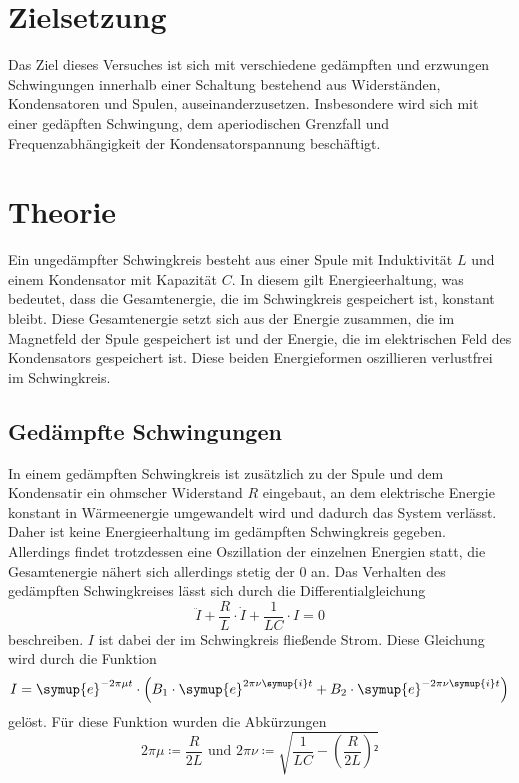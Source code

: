 \section{Zielsetzung}
\label{sec:Zielsetzung}
Das Ziel dieses Versuches ist sich mit verschiedene gedämpften und erzwungen Schwingungen innerhalb einer Schaltung
 bestehend aus Widerständen, Kondensatoren und Spulen, auseinanderzusetzen. Insbesondere wird sich mit einer gedäpften Schwingung, dem aperiodischen 
 Grenzfall und Frequenzabhängigkeit der Kondensatorspannung beschäftigt. 
\section{Theorie}
\label{sec:Theorie}
Ein ungedämpfter Schwingkreis besteht aus einer Spule mit Induktivität $L$ und einem Kondensator mit Kapazität $C$. In diesem gilt Energieerhaltung, was bedeutet, 
dass die Gesamtenergie, die im Schwingkreis gespeichert ist, konstant bleibt. Diese Gesamtenergie setzt sich aus der Energie zusammen, die im Magnetfeld der Spule
gespeichert ist und der Energie, die im elektrischen Feld des Kondensators gespeichert ist. Diese beiden Energieformen oszillieren verlustfrei im Schwingkreis. 

\subsection{Gedämpfte Schwingungen}
In einem gedämpften Schwingkreis ist zusätzlich zu der Spule und dem Kondensatir ein ohmscher Widerstand $R$ eingebaut, an dem elektrische Energie konstant in 
Wärmeenergie umgewandelt wird und dadurch das System verlässt. Daher ist keine Energieerhaltung im gedämpften Schwingkreis gegeben. Allerdings findet trotzdessen eine 
Oszillation der einzelnen Energien statt, die Gesamtenergie nähert sich allerdings stetig der $0$ an. 
Das Verhalten des gedämpften Schwingkreises lässt sich durch die Differentialgleichung 
\begin{equation}
    \ddot{I} + \frac{R}{L} \cdot \dot{I} + \frac{1}{L C} \cdot I = 0 
\end{equation}
beschreiben. $I$ ist dabei der im Schwingkreis fließende Strom. 
Diese Gleichung wird durch die Funktion  
\begin{equation}
    I = \symup{e}^{-2\pi\mu t} \cdot \left(B_1 \cdot \symup{e}^{2\pi\nu \symup{i}t}  + B_2 \cdot \symup{e}^{- 2\pi\nu \symup{i}t} \right)
\end{equation}
gelöst. Für diese Funktion wurden die Abkürzungen 
\begin{equation*}
2 \pi \mu \coloneqq \frac{R}{2 L}  \,\,\text{und}\,\, 2 \pi \nu \coloneqq \sqrt{\frac{1}{LC} - \left(\frac{R}{2L}\right)²}
\end{equation*}


